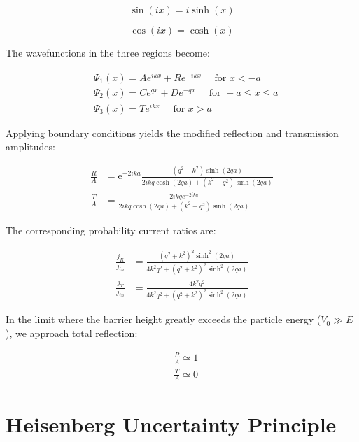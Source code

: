 \documentclass[italian]{HKNdocument}
\begin{document}
\begin{equation}
\sin (i x)=i \sinh (x) \label{eq:6.75}
\end{equation}

\begin{equation}
\cos (i x)=\cosh (x) \label{eq:6.76}
\end{equation}

The wavefunctions in the three regions become:

\begin{align}
& \Psi_{1}(x)=A e^{i k x}+R e^{-i k x} \quad \text { for } x<-a \\
& \Psi_{2}(x)=C e^{q x}+D e^{-q x} \quad \text { for }-a \leq x \leq a  \label{eq:6.77}\\
& \Psi_{3}(x)=T e^{i k x} \quad \text { for } x>a
\end{align}

Applying boundary conditions yields the modified reflection and transmission amplitudes:

\begin{align}
\frac{R}{A} & =\mathrm{e}^{-2 i k a} \frac{\left(q^{2}-k^{2}\right) \sinh (2 q a)}{2 i k q \cosh (2 q a)+\left(k^{2}-q^{2}\right) \sinh (2 q a)} \\
\frac{T}{A} & =\frac{2 i k q e^{-2 i k a}}{2 i k q \cosh (2 q a)+\left(k^{2}-q^{2}\right) \sinh (2 q a)} \label{eq:6.78}
\end{align}

The corresponding probability current ratios are:

\begin{align}
\frac{j_{R}}{j_{i n}} & =\frac{\left(q^{2}+k^{2}\right)^{2} \sinh ^{2}(2 q a)}{4 k^{2} q^{2}+\left(q^{2}+k^{2}\right)^{2} \sinh ^{2}(2 q a)}  \label{eq:6.79}\\
\frac{j_{T}}{j_{i n}} & =\frac{4 k^{2} q^{2}}{4 k^{2} q^{2}+\left(q^{2}+k^{2}\right)^{2} \sinh ^{2}(2 q a)}
\end{align}

In the limit where the barrier height greatly exceeds the particle energy ($V_0 \gg E$), we approach total reflection:

\begin{align}
& \frac{R}{A} \simeq 1  \label{eq:6.80}\\
& \frac{T}{A} \simeq 0
\end{align}

\section{Heisenberg Uncertainty Principle}
\end{document}
